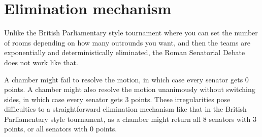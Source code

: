 


\section{Elimination mechanism}

Unlike the British Parliamentary style tournament where you can set the number of rooms depending on how many outrounds you want, and then the teams are exponentially and deterministically eliminated, the Roman Senatorial Debate does not work like that. 

A chamber might fail to resolve the motion, in which case every senator gets 0 points. A chamber might also resolve the motion unanimously without switching sides, in which case every senator gets 3 points. These irregularities pose difficulties to a straightforward elimination mechanism like that in the British Parliamentary style tournament, as a chamber might return all 8 senators with 3 points, or all senators with 0 points. 











